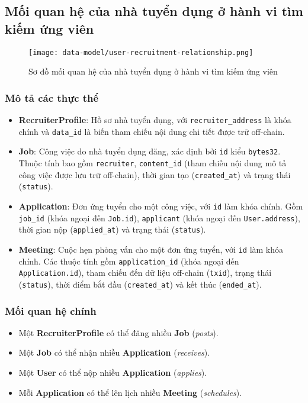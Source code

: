 \subsection{Mối quan hệ của nhà tuyển dụng ở hành vi tìm kiếm ứng viên}

\begin{figure}[H]
  \centering
  \texttt{[image: data-model/user-recruitment-relationship.png]}
  \caption{Sơ đồ mối quan hệ của nhà tuyển dụng ở hành vi tìm kiếm ứng viên}
  \label{fig:user-recruitment-relationship}
\end{figure}

\subsubsection{Mô tả các thực thể}

\begin{itemize}
  \item \textbf{RecruiterProfile}: Hồ sơ nhà tuyển dụng, với \texttt{recruiter\_address} là khóa chính và \texttt{data\_id} là biến tham chiếu nội dung chi tiết được trữ off-chain.
  \item \textbf{Job}: Công việc do nhà tuyển dụng đăng, xác định bởi \texttt{id} kiểu \texttt{bytes32}. Thuộc tính bao gồm \texttt{recruiter}, \texttt{content\_id} (tham chiếu nội dung mô tả công việc được lưu trữ off-chain), thời gian tạo (\texttt{created\_at}) và trạng thái (\texttt{status}).
  \item \textbf{Application}: Đơn ứng tuyển cho một công việc, với \texttt{id} làm khóa chính. Gồm \texttt{job\_id} (khóa ngoại đến \texttt{Job.id}), \texttt{applicant} (khóa ngoại đến \texttt{User.address}), thời gian nộp (\texttt{applied\_at}) và trạng thái (\texttt{status}).
  \item \textbf{Meeting}: Cuộc hẹn phỏng vấn cho một đơn ứng tuyển, với \texttt{id} làm khóa chính. Các thuộc tính gồm \texttt{application\_id} (khóa ngoại đến \texttt{Application.id}), tham chiếu đến dữ liệu off-chain (\texttt{txid}), trạng thái (\texttt{status}), thời điểm bắt đầu (\texttt{created\_at}) và kết thúc (\texttt{ended\_at}).
\end{itemize}

\subsubsection{Mối quan hệ chính}
\begin{itemize}
  \item Một \textbf{RecruiterProfile} có thể đăng nhiều \textbf{Job} (\emph{posts}).
  \item Một \textbf{Job} có thể nhận nhiều \textbf{Application} (\emph{receives}).
  \item Một \textbf{User} có thể nộp nhiều \textbf{Application} (\emph{applies}).
  \item Mỗi \textbf{Application} có thể lên lịch nhiều \textbf{Meeting} (\emph{schedules}).
\end{itemize}

